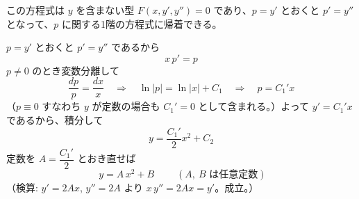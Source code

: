 
この方程式は $y$ を含まない型 $F(x, y', y'') = 0$ であり、$p = y'$ とおくと $p' = y''$ となって、$p$ に関する1階の方程式に帰着できる。

$p = y'$ とおくと $p' = y''$ であるから
\[
x\,p' = p
\]
$p \neq 0$ のとき変数分離して
\[
\frac{dp}{p} = \frac{dx}{x}
\quad\Longrightarrow\quad
\ln|p| = \ln|x| + C_{1}
\quad\Longrightarrow\quad
p = C_{1}' x
\]
（$p \equiv 0$ すなわち $y$ が定数の場合も $C_{1}' = 0$ として含まれる。）よって $y' = C_{1}' x$ であるから、積分して
\[
y = \frac{C_{1}'}{2}x^{2} + C_{2}
\]
定数を $A = \dfrac{C_{1}'}{2}$ とおき直せば
\[
\boxed{\; y = A\,x^{2} + B \;}
\qquad (A,\ B \text{ は任意定数})
\]
（検算: $y' = 2Ax$, $y'' = 2A$ より $x\,y'' = 2Ax = y'$。成立。）
